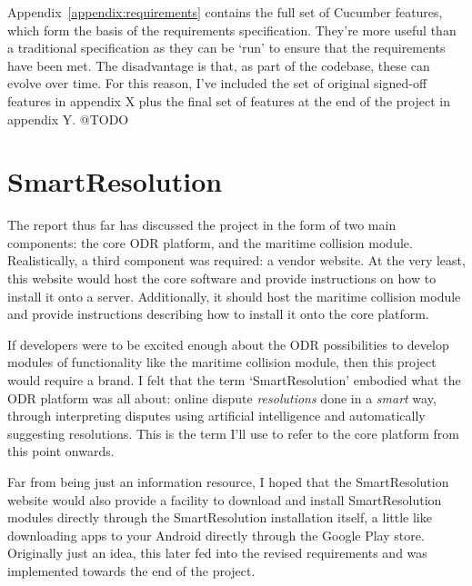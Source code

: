 Appendix~\ref{appendix:requirements} contains the full set of Cucumber features, which form the basis of the requirements specification. They're more useful than a traditional specification as they can be `run' to ensure that the requirements have been met. The disadvantage is that, as part of the codebase, these can evolve over time. For this reason, I've included the set of original signed-off features in appendix X plus the final set of features at the end of the project in appendix Y. @TODO

\section{SmartResolution}

The report thus far has discussed the project in the form of two main components: the core ODR platform, and the maritime collision module. Realistically, a third component was required: a vendor website. At the very least, this website would host the core software and provide instructions on how to install it onto a server. Additionally, it should host the maritime collision module and provide instructions describing how to install it onto the core platform.

If developers were to be excited enough about the ODR possibilities to develop modules of functionality like the maritime collision module, then this project would require a brand. I felt that the term `SmartResolution' embodied what the ODR platform was all about: online dispute \emph{resolutions} done in a \emph{smart} way, through interpreting disputes using artificial intelligence and automatically suggesting resolutions. This is the term I'll use to refer to the core platform from this point onwards.

Far from being just an information resource, I hoped that the SmartResolution website would also provide a facility to download and install SmartResolution modules directly through the SmartResolution installation itself, a little like downloading apps to your Android directly through the Google Play store. Originally just an idea, this later fed into the revised requirements and was implemented towards the end of the project.